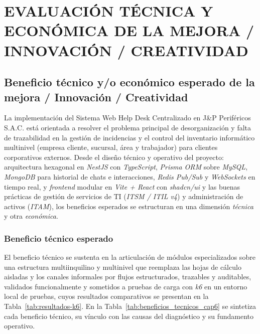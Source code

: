 \chapter[CAPÍTULO VI]{EVALUACIÓN TÉCNICA Y ECONÓMICA DE LA MEJORA / INNOVACIÓN / CREATIVIDAD}

\section{Beneficio técnico y/o económico esperado de la mejora / Innovación / Creatividad}

La implementación del Sistema Web Help Desk Centralizado en J\&P Periféricos S.A.C. está orientada a resolver el problema principal de desorganización y falta de trazabilidad en la gestión de incidencias y el control del inventario informático multinivel (empresa cliente, sucursal, área y trabajador) para clientes corporativos externos. Desde el diseño técnico y operativo del proyecto: arquitectura hexagonal en \textit{NestJS} con \textit{TypeScript}, \textit{Prisma ORM} sobre \textit{MySQL}, \textit{MongoDB} para historial de chats e interacciones, \textit{Redis Pub/Sub} y \textit{WebSockets} en tiempo real, y \textit{frontend} modular en \textit{Vite + React} con \textit{shadcn/ui} y las buenas prácticas de gestión de servicios de TI (\textit{ITSM / ITIL v4}) y administración de activos (\textit{ITAM}), los beneficios esperados se estructuran en una dimensión \textit{técnica} y otra \textit{económica}.

\subsection{Beneficio técnico esperado}

El beneficio técnico se sustenta en la articulación de módulos especializados sobre una estructura multiinquilino y multinivel que reemplaza las hojas de cálculo aisladas y los canales informales por flujos estructurados, trazables y auditables, validados funcionalmente y sometidos a pruebas de carga con \textit{k6} en un entorno local de pruebas, cuyos resultados comparativos se presentan en la Tabla~\ref{tab:resultados-k6}. En la Tabla~\ref{tab:beneficios_tecnicos_cap6} se sintetiza cada beneficio técnico, su vínculo con las causas del diagnóstico y su fundamento operativo.

